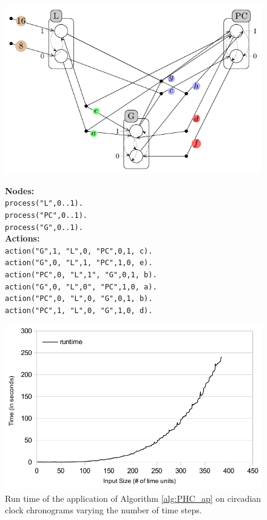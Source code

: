 \begin{figure}

\includegraphics[width=0.4\linewidth]{images/circadianPH.pdf}
%
\hspace{1cm}
%
\begin{minipage}{0.5\linewidth}
	\textbf{Nodes:} \\
\texttt{{\footnotesize process("L",0..1).} }\\
\texttt{{\footnotesize process("PC",0..1).}}\\
\texttt{{\footnotesize process("G",0..1).} }\\

\textbf{Actions:} \\
\texttt{{\footnotesize action("G",1, "L",0, "PC",0,1, c).}} ~\\
\texttt{{\footnotesize action("G",0, "L",1, "PC",1,0, e).}} ~\\
\texttt{{\footnotesize action("PC",0, "L",1", "G",0,1, b).}} ~\\

\texttt{{\footnotesize action("G",0, "L",0", "PC",1,0, a).}} ~\\
\texttt{{\footnotesize action("PC",0, "L",0, "G",0,1, b).}} ~\\
\texttt{{\footnotesize action("PC",1, "L",0, "G",1,0, d).}} 
\end{minipage}
\end{figure}
%
\begin{figure}
\begin{center}
\includegraphics[width=0.6\linewidth]{images/circadian_run_time}
\end{center}
\caption{Run time of the application of Algorithm \ref{alg:PHC_ap} on circadian clock chronograms varying the number of time steps.}
\label{fig:run_time}
\end{figure}

